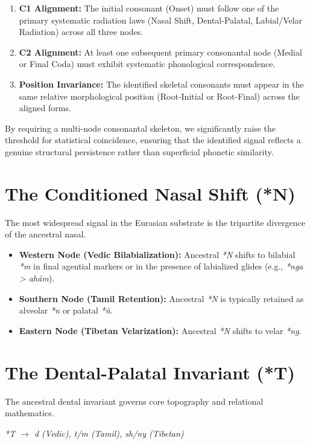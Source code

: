 \documentclass[11pt,oneside,openany]{book}
\begin{document}
\begin{enumerate}
    \item \textbf{C1 Alignment:} The initial consonant (Onset) must follow one of the primary systematic radiation laws (Nasal Shift, Dental-Palatal, Labial/Velar Radiation) across all three nodes.
    \item \textbf{C2 Alignment:} At least one subsequent primary consonantal node (Medial or Final Coda) must exhibit systematic phonological correspondence.
    \item \textbf{Position Invariance:} The identified skeletal consonants must appear in the same relative morphological position (Root-Initial or Root-Final) across the aligned forms.
\end{enumerate}

By requiring a multi-node consonantal skeleton, we significantly raise the threshold for statistical coincidence, ensuring that the identified signal reflects a genuine structural persistence rather than superficial phonetic similarity.

\section{The Conditioned Nasal Shift (*N)}
The most widespread signal in the Eurasian substrate is the tripartite divergence of the ancestral nasal.
\begin{itemize}
    \item \textbf{Western Node (Vedic Bilabialization):} Ancestral \textit{*N} shifts to bilabial \textit{*m} in final agential markers or in the presence of labialized glides (e.g., \textit{*nga > ahám}).
    \item \textbf{Southern Node (Tamil Retention):} Ancestral \textit{*N} is typically retained as alveolar \textit{*n} or palatal \textit{*ñ}.
    \item \textbf{Eastern Node (Tibetan Velarization):} Ancestral \textit{*N} shifts to velar \textit{*ng}.
\end{itemize}

\section{The Dental-Palatal Invariant (*T)}
The ancestral dental invariant governs core topography and relational mathematics. 
\begin{center}
\textit{*T $\rightarrow$ d (Vedic), t/m (Tamil), sh/ny (Tibetan)}
\end{center}
\end{document}
